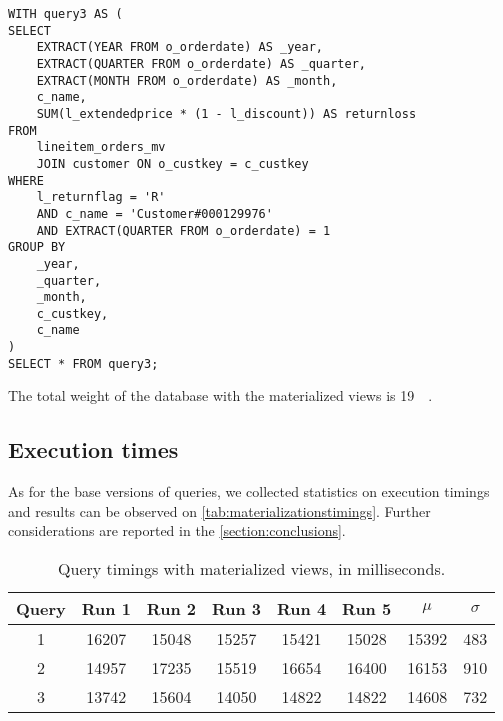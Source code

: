 \begin{lstlisting}
WITH query3 AS (
SELECT
	EXTRACT(YEAR FROM o_orderdate) AS _year,
	EXTRACT(QUARTER FROM o_orderdate) AS _quarter,
	EXTRACT(MONTH FROM o_orderdate) AS _month,
	c_name,
	SUM(l_extendedprice * (1 - l_discount)) AS returnloss
FROM
	lineitem_orders_mv
	JOIN customer ON o_custkey = c_custkey
WHERE 
	l_returnflag = 'R'
	AND c_name = 'Customer#000129976'
	AND EXTRACT(QUARTER FROM o_orderdate) = 1
GROUP BY
	_year,
	_quarter,
	_month,
	c_custkey,
	c_name
)
SELECT * FROM query3;
\end{lstlisting}

The total weight of the database with the materialized views is \SI{19}{\giga\byte}.


\subsection{Execution times}

As for the base versions of queries, we collected statistics on execution timings and results can be observed on \autoref{tab:materializationstimings}. Further considerations are reported in the \autoref{section:conclusions}.

\begin{table}[!h]
\centering
\begin{tabular}{|| c | c c c c c | c c ||} 
 \hline
 Query & Run 1 & Run 2 & Run 3 & Run 4 & Run 5 & 	$\mu$ & $\sigma$ \\ [0.5ex] 
 \hline\hline
 1 & \num{16207} & \num{15048} & \num{15257} & \num{15421} & \num{15028} & \num{15392} & \num{483} \\ 
 \hline
 2 & \num{14957} & \num{17235} & \num{15519} & \num{16654} & \num{16400} & \num{16153} & \num{910} \\ 
 \hline
 3 & \num{13742} & \num{15604} & \num{14050} & \num{14822} & \num{14822} & \num{14608} & \num{732} \\ 
 \hline
\end{tabular}
  \caption{Query timings with materialized views, in milliseconds.}
  \label{tab:materializationstimings}
\end{table}